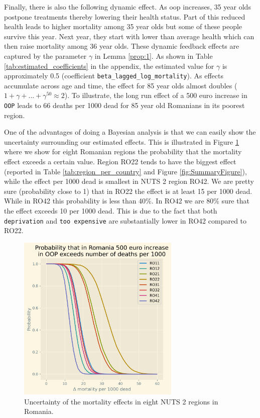 \documentclass[a4paper,12pt]{article}
\begin{document}
Finally, there is also the following dynamic effect. As oop increases, 35 year olds postpone treatments thereby lowering their health status. Part of this reduced health leads to higher mortality among 35 year olds but some of these people survive this year. Next year, they start with lower than average health which can then raise mortality among 36 year olds. These dynamic feedback effects are captured by the parameter \(\gamma\) in Lemma \ref{prop:1}. As shown in Table \ref{tab:estimated_coefficients} in the appendix, the estimated value for \(\gamma\) is approximately 0.5 (coefficient \texttt{beta\_lagged\_log\_mortality}). As effects accumulate across age and time, the effect for 85 year olds almost doubles (\(1+\gamma+...+\gamma^{50} \approx 2\)). To illustrate, the long run effect of a 500 euro increase in \texttt{OOP} leads to 66 deaths per 1000 dead for 85 year old Romanians in its poorest region.

One of the advantages of doing a Bayesian analysis is that we can easily show the uncertainty surrounding our estimated effects. This is illustrated in Figure \ref{fig:EffectRO} where we show for eight Romanian regions the probability that the mortality effect exceeds a certain value. Region RO22 tends to have the biggest effect (reported in Table \ref{tab:region_per_country} and Figure \ref{fig:SummaryFigure}), while the effect per 1000 dead is smallest in NUTS 2 region RO42. We are pretty sure (probability close to 1) that in RO22 the effect is at least 15 per 1000 dead. While in RO42 this probability is less than 40\%. In RO42 we are 80\% sure that the effect exceeds 10 per 1000 dead. This is due to the fact that both \texttt{deprivation} and \texttt{too expensive} are substantially lower in RO42 compared to RO22.

\begin{figure}[htbp]
\centering
\includegraphics[height=8cm]{./figures/Effect_RO.png}
\caption{\label{fig:EffectRO}Uncertainty of the mortality effects in eight NUTS 2 regions in Romania.}
\end{figure}
\end{document}
